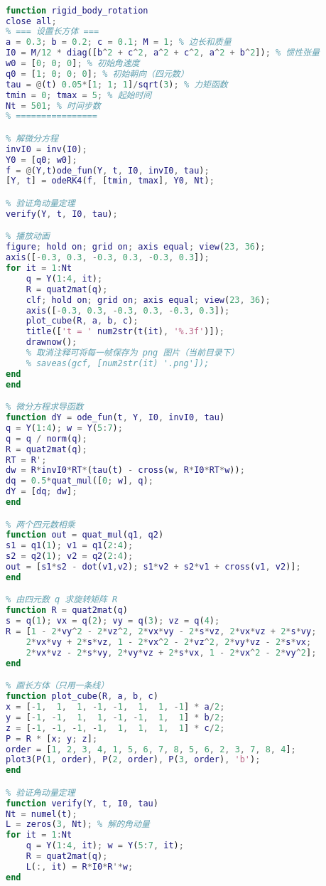 \begin{lstlisting}[language=matlab, caption=rigBdRot.m]
% 刚体绕固定点转动的数值计算

function rigid_body_rotation
close all;
% === 设置长方体 ===
a = 0.3; b = 0.2; c = 0.1; M = 1; % 边长和质量
I0 = M/12 * diag([b^2 + c^2, a^2 + c^2, a^2 + b^2]); % 惯性张量
w0 = [0; 0; 0]; % 初始角速度
q0 = [1; 0; 0; 0]; % 初始朝向（四元数）
tau = @(t) 0.05*[1; 1; 1]/sqrt(3); % 力矩函数
tmin = 0; tmax = 5; % 起始时间
Nt = 501; % 时间步数
% ================

% 解微分方程
invI0 = inv(I0);
Y0 = [q0; w0];
f = @(Y,t)ode_fun(Y, t, I0, invI0, tau);
[Y, t] = odeRK4(f, [tmin, tmax], Y0, Nt);

% 验证角动量定理
verify(Y, t, I0, tau);

% 播放动画
figure; hold on; grid on; axis equal; view(23, 36);
axis([-0.3, 0.3, -0.3, 0.3, -0.3, 0.3]);
for it = 1:Nt
    q = Y(1:4, it);
    R = quat2mat(q);
    clf; hold on; grid on; axis equal; view(23, 36);
    axis([-0.3, 0.3, -0.3, 0.3, -0.3, 0.3]);
    plot_cube(R, a, b, c);
    title(['t = ' num2str(t(it), '%.3f')]);
    drawnow();
    % 取消注释可将每一帧保存为 png 图片（当前目录下）
    % saveas(gcf, [num2str(it) '.png']);
end
end

% 微分方程求导函数
function dY = ode_fun(t, Y, I0, invI0, tau)
q = Y(1:4); w = Y(5:7);
q = q / norm(q);
R = quat2mat(q);
RT = R';
dw = R*invI0*RT*(tau(t) - cross(w, R*I0*RT*w));
dq = 0.5*quat_mul([0; w], q);
dY = [dq; dw];
end

% 两个四元数相乘
function out = quat_mul(q1, q2)
s1 = q1(1); v1 = q1(2:4);
s2 = q2(1); v2 = q2(2:4);
out = [s1*s2 - dot(v1,v2); s1*v2 + s2*v1 + cross(v1, v2)];
end

% 由四元数 q 求旋转矩阵 R
function R = quat2mat(q)
s = q(1); vx = q(2); vy = q(3); vz = q(4);
R = [1 - 2*vy^2 - 2*vz^2, 2*vx*vy - 2*s*vz, 2*vx*vz + 2*s*vy;
    2*vx*vy + 2*s*vz, 1 - 2*vx^2 - 2*vz^2, 2*vy*vz - 2*s*vx;
    2*vx*vz - 2*s*vy, 2*vy*vz + 2*s*vx, 1 - 2*vx^2 - 2*vy^2];
end

% 画长方体（只用一条线）
function plot_cube(R, a, b, c)
x = [-1,  1,  1, -1, -1,  1,  1, -1] * a/2;
y = [-1, -1,  1,  1, -1, -1,  1,  1] * b/2;
z = [-1, -1, -1, -1,  1,  1,  1,  1] * c/2;
P = R * [x; y; z];
order = [1, 2, 3, 4, 1, 5, 6, 7, 8, 5, 6, 2, 3, 7, 8, 4];
plot3(P(1, order), P(2, order), P(3, order), 'b');
end

% 验证角动量定理
function verify(Y, t, I0, tau)
Nt = numel(t);
L = zeros(3, Nt); % 解的角动量
for it = 1:Nt
    q = Y(1:4, it); w = Y(5:7, it);
    R = quat2mat(q);
    L(:, it) = R*I0*R'*w;
end


\end{lstlisting}
